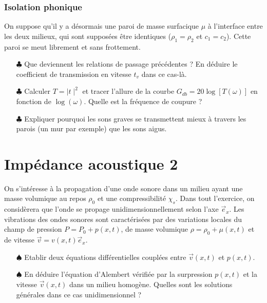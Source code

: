 \documentclass{report}
\begin{document}
\subsubsection*{Isolation phonique}

On suppose qu'il y a désormais une paroi de masse surfacique $\mu$ à l'interface entre les deux milieux, qui sont supposées être identiques ($\rho_1=\rho_2$ et $c_1=c_2$). Cette paroi se meut librement et sans frottement. 

\begin{itemize}
	
	\item[$\clubsuit$] Que deviennent les relations de passage précédentes ? En déduire le coefficient de transmission en vitesse $t_v$ dans ce cas-là. 
	
	\item[$\clubsuit$] Calculer $T=\mid t\mid^2$ et tracer l'allure de la courbe $G_{db}=20\log\left[T(\omega) \right]$ en fonction de $\log(\omega)$. Quelle est la fréquence de coupure ?
	
	\item[$\clubsuit$] Expliquer pourquoi les sons graves se transmettent mieux à travers les parois (un mur par exemple) que les sons aigus.
	
\end{itemize}

\newpage

\newpage

\section*{Impédance acoustique 2}

On s'intéresse à la propagation d'une onde sonore dans un milieu ayant une masse volumique au repos $\rho_0$ et une compressibilité $\chi_s$. Dans tout l'exercice, on considèrera que l'onde se propage unidimensionnellement selon l'axe $\vec{e}_x$. Les vibrations des ondes sonores sont caractérisées par des variations locales du champ de pression $P = P_0 + p(x,t)$, de masse volumique $\rho=\rho_0 + \mu(x,t)$ et de vitesse $\vec{v}=v(x,t)\vec{e}_x$. 

\begin{itemize}

	\item[$\spadesuit$] Etablir deux équations différentielles couplées entre $\vec{v}(x,t)$ et $p(x,t)$.
	
	\item[$\spadesuit$] En déduire l'équation d'Alembert vérifiée par la surpression $p(x,t)$ et la vitesse $\vec{v}(x,t)$ dans un milieu homogène. Quelles sont les solutions générales dans ce cas unidimensionnel ? 

\end{itemize}	
	
\end{document}
